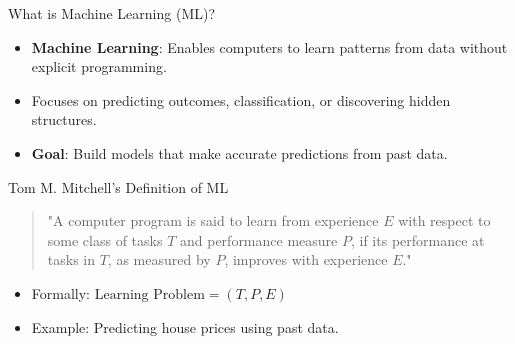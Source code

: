 \documentclass[serif, aspectratio=169]{beamer}
\begin{document}
    \begin{frame}{What is Machine Learning (ML)?}
        \begin{itemize}
            \item \textbf{Machine Learning}: Enables computers to learn patterns from data without explicit programming.
            \item Focuses on predicting outcomes, classification, or discovering hidden structures.
            \vspace{4mm}

            \item \textbf{Goal}: Build models that make accurate predictions from past data.
        \end{itemize}
    \end{frame}



    \begin{frame}{Tom M. Mitchell's Definition of ML}
        \begin{quote}
            "A computer program is said to learn from experience $E$ with respect to some class of tasks $T$ and performance measure $P$, if its performance at tasks in $T$, as measured by $P$, improves with experience $E$."
        \end{quote}
        \vspace{2mm}
        \begin{itemize}
            \item Formally: $\text{Learning Problem} = (T, P, E)$
            \item Example: Predicting house prices using past data.
        \end{itemize}
    \end{frame}
\end{document}

